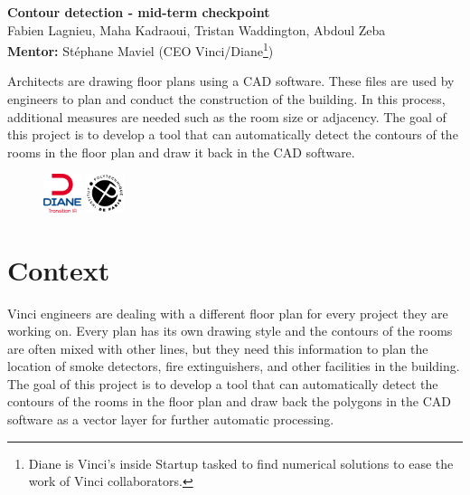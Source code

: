 \documentclass[11pt]{article}
\begin{document}
\begin{center}
\textbf{Contour detection - mid-term checkpoint} \\
Fabien Lagnieu, Maha Kadraoui, Tristan Waddington, Abdoul Zeba\\
\textbf{Mentor:} Stéphane Maviel (CEO Vinci/Diane\footnote{Diane is Vinci's inside Startup tasked to find numerical solutions
to ease the work of Vinci collaborators.}) \\\vspace{2em}
\textbf{\Large }
\end{center}
\vspace{-1cm}
Architects are drawing floor plans using a CAD software. These files are used
by engineers to plan and conduct the construction of the building. In this process,
additional measures are needed such as the room size or adjacency. The goal of 
this project is to develop a tool that can automatically detect the contours of 
the rooms in the floor plan and draw it back in the CAD software. 

\begin{figure}[h]
    \centering
    \includegraphics[width=0.1\textwidth]{figures/Diane.png}
    \hspace{0.2\textwidth}
    \includegraphics[width=0.1\textwidth]{figures/ipparis.png}
    \label{fig:my_label}
\end{figure}

\section{Context}
Vinci engineers are dealing with a different floor plan for every project they are working on.
Every plan has its own drawing style and the contours of the rooms are often mixed with other
lines, but they need this information to plan the location of smoke detectors, fire extinguishers,
and other facilities in the building. The goal of this project is to develop a tool that can
automatically detect the contours of the rooms in the floor plan and draw back the polygons in the CAD software as 
a vector layer for further automatic processing. 
\end{document}
